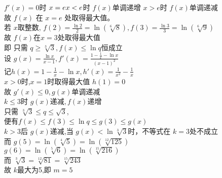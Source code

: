 \documentclass[class=ctexart,crop=false]{standalone}
\begin{document}
\begin{enumerate}[label=(\arabic*)]
\begin{enumerate}[label=\protect \circled{ \arabic*}]
            $f'(x)=0$时 $x=e \\
            x<e$时 $f(x)$单调递增 $x>e$时 $f(x)$单调递减\\
            故 $f(x)$ 在 $x=e$ 处取得最大值。\\
            若 $x$取整数, $f(2)=\frac{\ln{2}}{2}=\ln(\sqrt[6]{8}),f(3)=\frac{\ln{3}}{3}=\ln(\sqrt[6]{9})$\\
            故 $f(x)$在$x=3$处取得最大值\\
            即 只需  $q \geqslant \sqrt[3]{3} ,f(x)\leqslant \ln{q}$恒成立\\
            设 $g(x)=\frac{\ln{x}}{x-1},f'(x)=\frac{1-\frac{1}{x}-\ln{x}}{(x-1)^2}$\\
            记$h(x)=1-\frac{1}{x}-\ln{x},h'(x)=\frac{1}{x^2}-\frac{1}{x}$\\
            $x>0$时,$x=1$时取得最大值 $h(1)=0$\\
            故 $g'(x) \leqslant 0,g(x)$单调递减\\
            $k \leqslant 3$时 $g(x)$递减$,f(x)$递增\\
            只需 $\sqrt[3]{3}\leqslant q \leqslant \sqrt{3}$,\\
            便有$f(x) \leqslant f(3) \leqslant \ln{q} \leqslant g(3) \leqslant g(x)$\\
            $k >3$后 $g(x)$递减,当 $g(x)< \ln \sqrt[3]{3}$时，不等式在 $k=3$处不成立\\
            而 $g(5)=\ln(\sqrt[4]{5})=\ln(\sqrt[12]{125})$\\
            $g(6)=\ln(\sqrt[5]{6})=\ln(\sqrt[15]{216})$\\
            而 $\sqrt[3]{3}=\sqrt[12]{81}=\sqrt[15]{243}$\\
            故 $k$最大为5,即 $m=5$
        \end{enumerate}
    \end{enumerate}
\end{document}
